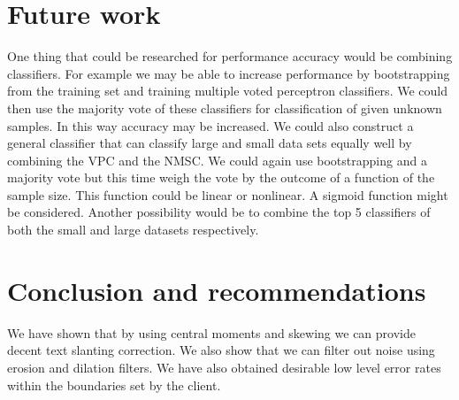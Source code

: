 \documentclass[%
        compressed,
        final,
        notitlepage,
        narroweqnarray,
        inline,
        twoside,
        ]{ieee}
\begin{document}
\section{Future work}

One thing that could be researched for performance accuracy would be combining
classifiers.  For example we may be able to increase performance by
bootstrapping from the training set and training multiple voted perceptron
classifiers. We could then use the majority vote of these classifiers for
classification of given unknown samples. In this way accuracy may be increased.
We could also construct a general classifier that can classify large and small
data sets equally well by combining the VPC and the NMSC. We could again use
bootstrapping and a majority vote but this time weigh the vote by the outcome of
a function of the sample size. This function could be linear or nonlinear. A
sigmoid function might be considered. Another possibility would be to combine
the top 5 classifiers of both the small and large datasets respectively. 



\section{Conclusion and recommendations}
We have shown that by using central moments and skewing we can provide decent
text slanting correction. We also show that we can filter out noise using
erosion and dilation filters. We have also obtained desirable low level error
rates within the boundaries set by the client.
\end{document}

